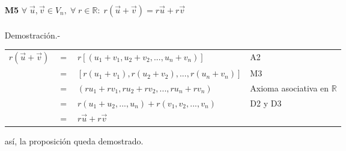 \begin{enumerate}
\item [\large\bfseries M5] $\forall\; \vec{u},\vec{v} \in V_n, \; \forall\; r \in \mathbb{R}:\; r(\vec{u}+\vec{v}) = r\vec{u} + r\vec{v}$\\\\
    Demostración.-\; 
    \begin{center}
	\begin{tabular}{rcll}
	    $r(\vec{u}+\vec{v})$&$=$&$r\left[(u_1+v_1,u_2+v_2,...,u_n+v_n)\right]$&A2\\
	    &$=$&$\left[r(u_1+v_1),r(u_2+v_2),...,r(u_n+v_n)\right]$&M3\\
	    &$=$&$(ru_1+rv_1,ru_2+rv_2,...,ru_n+rv_n)$&Axioma asociativa en $\mathbb{R}$\\
	    &$=$&$r(u_1+u_2,...,u_n)+r(v_1,v_2,...,v_n)$&D2 y D3\\
	    &$=$&$r\vec{u} + r\vec{v}$&\\
	\end{tabular}
    \end{center}
    así, la proposición queda demostrado.\\\\

\end{enumerate}


